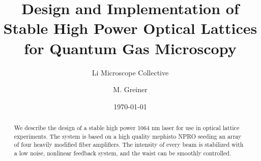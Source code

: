 \documentclass[twocolumn,aps,pra,showpacs,preprintnumbers,bibnotes]{revtex4-1}
\begin{document}
\title{Design and Implementation of Stable High Power Optical Lattices for Quantum Gas Microscopy}


\author{Li Microscope Collective}
\author{M. Greiner}

\date{\today}
\begin{abstract}
We describe the design of a stable high power 1064 nm laser for use in optical lattice experiments. The system is based on a high quality mephisto NPRO seeding an array of four heavily modified fiber amplifiers. The intensity of every beam is stabilized with a low noise, nonlinear feedback system, and the waist can be smoothly controlled. 
\end{abstract}
\maketitle
\end{document}
